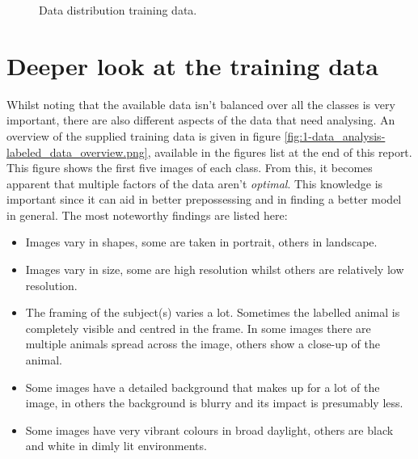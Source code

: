 \begin{figure}[H]
    \centering
    \captionsetup{width=0.5\linewidth}
    \captionsetup{justification=centering}
    \caption{Data distribution training data.}
    \label{fig:1-data_analysis-labeled_data_distribution}
\end{figure}


\section{Deeper look at the training data}
\label{section:DA_deeper_look_data}

Whilst noting that the available data isn't balanced over all the classes is very important, there are also different aspects of the data that need analysing. 
An overview of the supplied training data is given in figure \ref{fig:1-data_analysis-labeled_data_overview.png}, available in the figures list at the end of this report.
This figure shows the first five images of each class.
From this, it becomes apparent that multiple factors of the data aren't \emph{optimal}.
This knowledge is important since it can aid in better prepossessing and in finding a better model in general.
The most noteworthy findings are listed here:
\begin{itemize}
    \item Images vary in shapes, some are taken in portrait, others in landscape.
    \item Images vary in size, some are high resolution whilst others are relatively low resolution.
    \item The framing of the subject(s) varies a lot. Sometimes the labelled animal is completely visible and centred in the frame. In some images there are multiple animals spread across the image, others show a close-up of the animal.
    \item Some images have a detailed background that makes up for a lot of the image, in others the background is blurry and its impact is presumably less.
    \item Some images have very vibrant colours in broad daylight, others are black and white in dimly lit environments.
\end{itemize}

